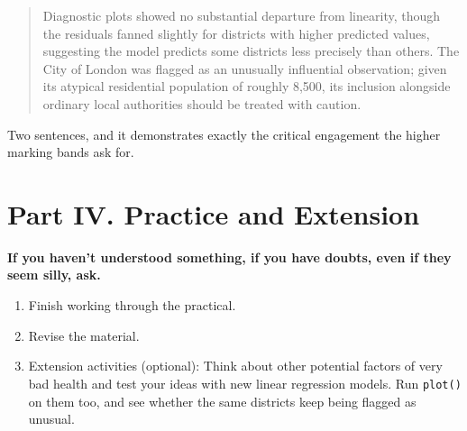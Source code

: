 \documentclass[
  letterpaper,
  DIV=11,
  numbers=noendperiod]{scrreprt}
\providecommand{\tightlist}{%
  \setlength{\itemsep}{0pt}\setlength{\parskip}{0pt}}
\begin{document}
\begin{quote}
Diagnostic plots showed no substantial departure from linearity, though
the residuals fanned slightly for districts with higher predicted
values, suggesting the model predicts some districts less precisely than
others. The City of London was flagged as an unusually influential
observation; given its atypical residential population of roughly 8,500,
its inclusion alongside ordinary local authorities should be treated
with caution.
\end{quote}

Two sentences, and it demonstrates exactly the critical engagement the
higher marking bands ask for.

\section{Part IV. Practice and
Extension}\label{part-iv.-practice-and-extension}

\textbf{If you haven't understood something, if you have doubts, even if
they seem silly, ask.}

\begin{enumerate}
\def\labelenumi{\arabic{enumi}.}
\tightlist
\item
  Finish working through the practical.
\item
  Revise the material.
\item
  Extension activities (optional): Think about other potential factors
  of very bad health and test your ideas with new linear regression
  models. Run \texttt{plot()} on them too, and see whether the same
  districts keep being flagged as unusual.
\end{enumerate}
\end{document}
